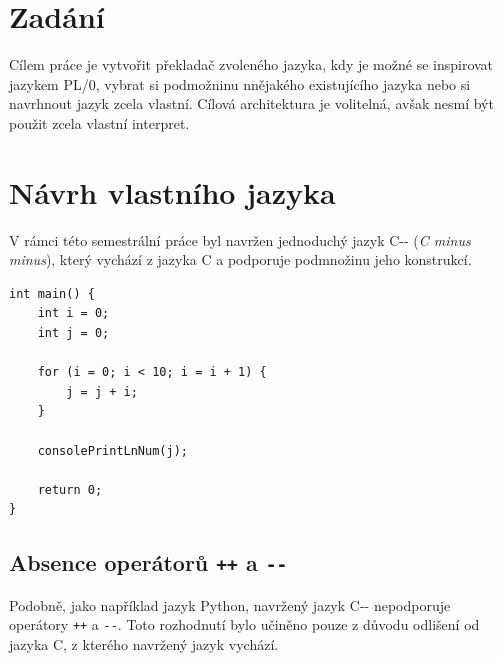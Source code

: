 \documentclass[12pt, a4paper]{article}
\let\oldsection\section
\renewcommand\section{\clearpage\oldsection}
\begin{document}
    \tableofcontents
    \pagebreak

    
\section{Zadání}

    Cílem práce je vytvořit překladač zvoleného jazyka, kdy je možné se inspirovat jazykem PL/0, vybrat si podmožninu nnějakého existujícího jazyka nebo si navrhnout jazyk zcela vlastní. Cílová architektura je volitelná, avšak nesmí být použit zcela vlastní interpret.


\section{Návrh vlastního jazyka}

V rámci této semestrální práce byl navržen jednoduchý jazyk C-{}- (\textit{C minus minus}), který vychází z jazyka C a podporuje podmnožinu jeho konstrukcí.

\begin{lstlisting}[caption={Ukázka programu v jazyce C-{}-}, captionpos=b]
int main() {
    int i = 0;
    int j = 0;

    for (i = 0; i < 10; i = i + 1) {
        j = j + i;
    }

    consolePrintLnNum(j);

    return 0;
}
\end{lstlisting}


\subsection{Absence operátorů \texttt{++} a \texttt{-{}-}}

Podobně, jako například jazyk Python, navržený jazyk C-{}- nepodporuje operátory \texttt{++} a \texttt{-{}-}. Toto rozhodnutí bylo učiněno pouze z důvodu odlišení od jazyka C, z kterého navržený jazyk vychází.
\end{document}
